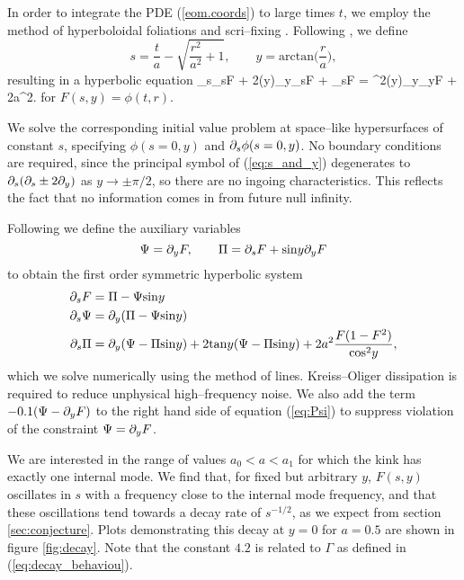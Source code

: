 In order to integrate the PDE (\ref{eom.coords}) to large times $t$, we employ the method of hyperboloidal foliations and scri--fixing \cite{hyp_foliations}. Following \cite{wavemaps, SG}, we define
\[
s = \frac{t}{a} - \sqrt{\frac{r^2}{a^2}+1}, \qquad y=\mathrm{arctan}\Big(\frac{r}{a}\Big),
\]
resulting in a hyperbolic equation
\be
\label{eq:s_and_y}
\p_s\p_sF + 2(y)\p_y\p_sF + \p_sF = ^2(y)\p_y\p_yF + 2a^2.
\ee
for $F(s,y)=\phi(t,r)$. %

We solve the corresponding initial value problem at space--like hypersurfaces of constant $s$, specifying $\phi(s=0,y)$ and $\partial_s\phi(s=0,y)$. No boundary conditions are required, since the principal symbol of (\ref{eq:s_and_y}) degenerates to $\partial_s(\partial_s\pm 2\partial_y)$ as $y\rightarrow\pm \pi/2$, so there are no ingoing characteristics. This reflects the fact that no information comes in from future null infinity.

Following \cite{wavemaps, sym_hyp} we define the auxiliary variables
\[
\Psi = \partial_yF, \qquad \Pi = \partial_sF + \mathrm{sin}y\partial_yF
\]
to obtain the first order symmetric hyperbolic system
\begin{align}
\partial_sF &= \Pi - \Psi\mathrm{sin}y \\
\label{eq:Psi} \partial_s\Psi &= \partial_y(\Pi-\Psi\mathrm{sin}y) \\
\partial_s\Pi &= \partial_y(\Psi-\Pi\mathrm{sin}y) + 2\mathrm{tan}y(\Psi-\Pi\mathrm{sin}y) + 2a^2\frac{F(1-F^2)}{\mathrm{cos}^2y},
\end{align}
which we solve numerically using the method of lines. Kreiss--Oliger dissipation is required to reduce unphysical high--frequency noise. We also add the term $-0.1(\Psi-\partial_yF)$ to the right hand side of equation (\ref{eq:Psi}) to suppress violation of the constraint $\Psi=\partial_yF$.

We are interested in the range of values $a_0<a<a_1$ for which the kink has exactly one internal mode. We find that, for fixed but arbitrary $y$, $F(s,y)$ oscillates in $s$ with a frequency close to the internal mode frequency, and that these oscillations tend towards a decay rate of $s^{-1/2}$, as we expect from section \ref{sec:conjecture}. Plots demonstrating this decay at $y=0$ for $a=0.5$ are shown in figure \ref{fig:decay}. Note that the constant $4.2$ is related to $\Gamma$ as defined in (\ref{eq:decay_behaviou}).

